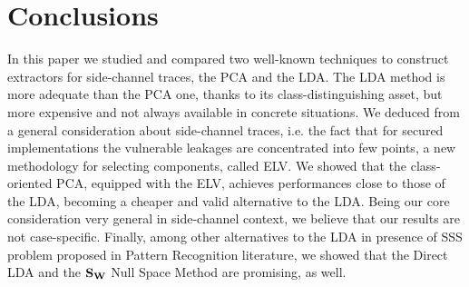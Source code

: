 \section{Conclusions}\label{sec:conclusions}

In this paper we studied and compared two well-known techniques to construct extractors for side-channel traces, the PCA and the LDA. The LDA method is more adequate than the PCA one, thanks to its class-distinguishing asset, but more expensive and not always available in concrete situations. We deduced from a general consideration about side-channel traces, i.e. the fact that for secured implementations the vulnerable leakages are concentrated into few points, a new methodology  for selecting components, called ELV. We showed that the class-oriented PCA, equipped with the ELV, achieves performances close to those of the LDA, becoming a cheaper and valid alternative to the LDA. Being our core consideration very general in side-channel context, we believe that our results are not case-specific. Finally, among other alternatives to the LDA in presence of SSS problem proposed in Pattern Recognition literature, we showed that the Direct LDA and the $\textbf{S}_{\textbf{W}}$ Null Space Method are promising, as well.


